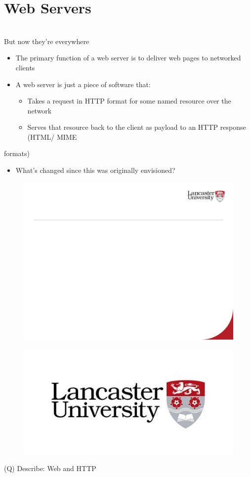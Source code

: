 \documentclass[12pt]{article}
\begin{document}
\section{Web Servers}
\\
But now they’re everywhere\\
\begin{itemize}
  \item The primary function of a web server is to deliver web pages to networked clients
  \item A web server is just a piece of software that:
\begin{itemize}
  \item Takes a request in HTTP format for some named resource over the network
  \item Serves that resource back to the client as payload to an HTTP response (HTML/ MIME 
\end{itemize}
\end{itemize}
formats)\\
\begin{itemize}
  \item What’s changed since this was originally envisioned?
\end{itemize}
\begin{figure}[H]
\includegraphics[width=0.5\linewidth]{page18-image-1.png}
\end{figure}
\begin{figure}[H]
\includegraphics[width=0.5\linewidth]{page18-image-2.png}
\end{figure}
\clearpage
(Q)
Describe: Web and HTTP
\clearpage
\end{document}
